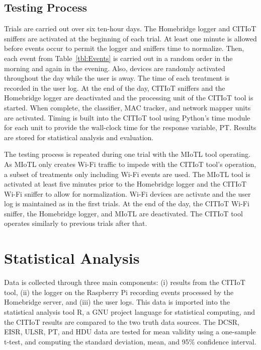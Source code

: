 \documentclass[12pt,letterpaper,oneside]{book}
\begin{document}
			\subsection{Testing Process}
			Trials are carried out over six ten-hour days. The Homebridge logger and \ac{CITIoT} sniffers are activated at the beginning of each trial. At least one minute is allowed before events occur to permit the logger and sniffers time to normalize. Then, each event from Table~\ref{tbl:Events} is carried out in a random order in the morning and again in the evening. Also, devices are randomly activated throughout the day while the user is away. The time of each treatment is recorded in the user log. At the end of the day, \ac{CITIoT} sniffers and the Homebridge logger are deactivated and the processing unit of the \ac{CITIoT} tool is started. When complete, the classifier, \ac{MAC} tracker, and network mapper units are activated. Timing is built into the \ac{CITIoT} tool using Python's time module for each unit to provide the wall-clock time for the response variable, \ac{PT}. Results are stored for statistical analysis and evaluation.
			
			The testing process is repeated during one trial with the \ac{MIoTL} tool operating. As \ac{MIoTL} only creates Wi-Fi traffic to impede with the \ac{CITIoT} tool's operation, a subset of treatments only including Wi-Fi events are used. The \ac{MIoTL} tool is activated at least five minutes prior to the Homebridge logger and the \ac{CITIoT} Wi-Fi sniffer to allow for normalization. Wi-Fi devices are activate and the user log is maintained as in the first trials. At the end of the day, the \ac{CITIoT} Wi-Fi sniffer, the Homebridge logger, and \ac{MIoTL} are deactivated. The \ac{CITIoT} tool operates similarly to previous trials after that.
			
		\section{Statistical Analysis}
		Data is collected through three main components: (i) results from the \ac{CITIoT} tool, (ii) the logger on the Raspberry Pi recording events processed by the Homebridge server, and (iii) the user logs. This data is imported into the statistical analysis tool R, a GNU project language for statistical computing, and the \ac{CITIoT} results are compared to the two truth data sources. The \ac{DCSR}, \ac{EISR}, \ac{ULSR}, \ac{PT}, and {HDU} data are tested for mean validity using a one-sample t-test, and computing the standard deviation, mean, and 95\% confidence interval.
		
\end{document}
